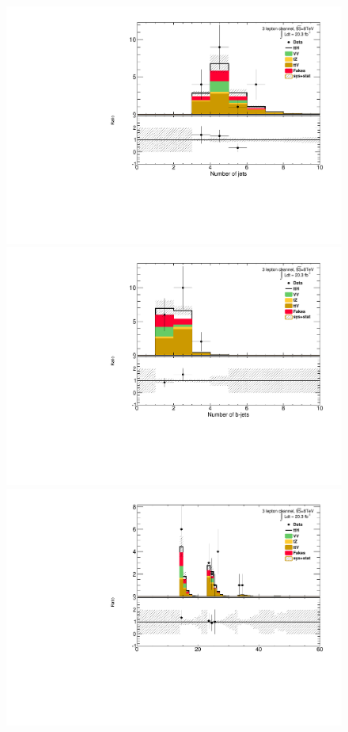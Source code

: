 \begin{figure}[!htbp]
  \begin{minipage}[h]{0.5\textwidth}
    \centering \includegraphics[width=\textwidth]{figs/results/plotCand_3lep_NJet}
  \end{minipage}\hfill
  \begin{minipage}[h]{0.5\textwidth}
    \centering \includegraphics[width=\textwidth]{figs/results/plotCand_3lep_NJetBTag}
  \end{minipage}\hfill
  \begin{minipage}[h]{0.5\textwidth}
    \centering \includegraphics[width=\textwidth]{figs/results/plotCand_3lep_NJet10}

\end{minipage}
\end{figure}
